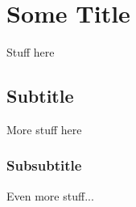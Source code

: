 \section*{Some Title}

Stuff here

\subsection*{Subtitle}

More stuff here

\subsubsection*{Subsubtitle}

Even more stuff... 